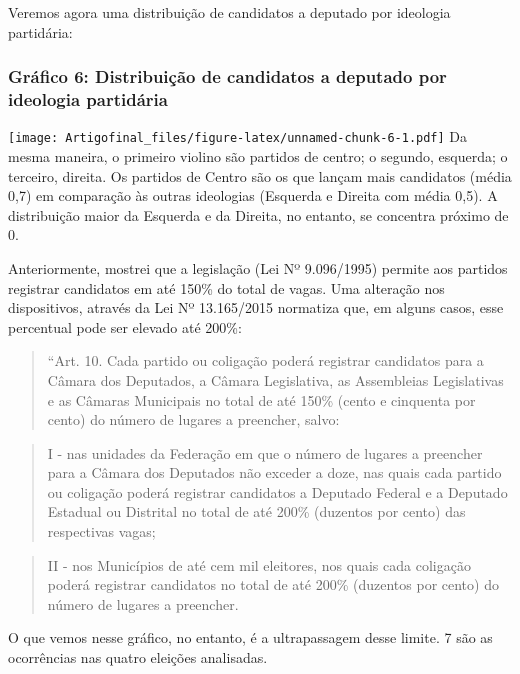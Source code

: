 \documentclass[]{article}
\begin{document}
Veremos agora uma distribuição de candidatos a deputado por ideologia
partidária:

\newpage

\subsubsection{Gráfico 6: Distribuição de candidatos a deputado por
ideologia
partidária}\label{grafico-6-distribuicao-de-candidatos-a-deputado-por-ideologia-partidaria}

\texttt{[image: Artigofinal\_files/figure-latex/unnamed-chunk-6-1.pdf]}
Da mesma maneira, o primeiro violino são partidos de centro; o segundo,
esquerda; o terceiro, direita. Os partidos de Centro são os que lançam
mais candidatos (média 0,7) em comparação às outras ideologias (Esquerda
e Direita com média 0,5). A distribuição maior da Esquerda e da Direita,
no entanto, se concentra próximo de 0.

Anteriormente, mostrei que a legislação (Lei Nº 9.096/1995) permite aos
partidos registrar candidatos em até 150\% do total de vagas. Uma
alteração nos dispositivos, através da Lei Nº 13.165/2015 normatiza que,
em alguns casos, esse percentual pode ser elevado até 200\%:

\begin{quote}
``Art. 10. Cada partido ou coligação poderá registrar candidatos para a
Câmara dos Deputados, a Câmara Legislativa, as Assembleias Legislativas
e as Câmaras Municipais no total de até 150\% (cento e cinquenta por
cento) do número de lugares a preencher, salvo:
\end{quote}

\begin{quote}
I - nas unidades da Federação em que o número de lugares a preencher
para a Câmara dos Deputados não exceder a doze, nas quais cada partido
ou coligação poderá registrar candidatos a Deputado Federal e a Deputado
Estadual ou Distrital no total de até 200\% (duzentos por cento) das
respectivas vagas;
\end{quote}

\begin{quote}
II - nos Municípios de até cem mil eleitores, nos quais cada coligação
poderá registrar candidatos no total de até 200\% (duzentos por cento)
do número de lugares a preencher.
\end{quote}

O que vemos nesse gráfico, no entanto, é a ultrapassagem desse limite. 7
são as ocorrências nas quatro eleições analisadas.
\end{document}
